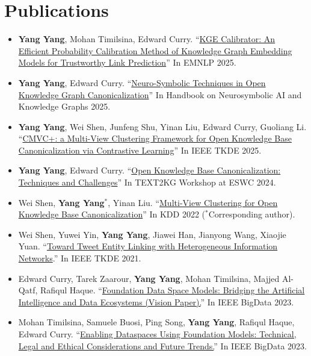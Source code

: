 \documentclass[a4paper,12pt]{article} %
\begin{document}
\section{Publications}
\begin{itemize}
\item {\textbf{Yang Yang}, Mohan Timilsina, Edward Curry. “\href{}{KGE Calibrator: An Efficient Probability Calibration Method of Knowledge Graph Embedding Models for Trustworthy Link Prediction}” In EMNLP 2025. }

\item {\textbf{Yang Yang}, Edward Curry. “\href{https://ebooks.iospress.nl/volumearticle/72299}{Neuro-Symbolic Techniques in Open Knowledge Graph Canonicalization}” In Handbook on Neurosymbolic AI and Knowledge Graphs 2025. }

\item {\textbf{Yang Yang}, Wei Shen, Junfeng Shu, Yinan Liu, Edward Curry, Guoliang Li. “\href{https://drive.google.com/file/d/19y55BQx21IJrOf-jqywshk4yBrQE0ANr/view}{CMVC+: a Multi-View Clustering Framework for Open Knowledge Base Canonicalization via Contrastive Learning}” In IEEE TKDE 2025. }

\item {\textbf{Yang Yang}, Edward Curry. “\href{https://ceur-ws.org/Vol-3747/text2kg_paper5.pdf}{Open Knowledge Base Canonicalization: Techniques and Challenges}” In TEXT2KG Workshop at ESWC 2024. }

\item {Wei Shen, \textbf{Yang Yang}$^{*}$, Yinan Liu. “\href{https://dl.acm.org/doi/abs/10.1145/3534678.3539449}{Multi-View Clustering for Open Knowledge Base Canonicalization}” In KDD 2022 ($^{*}$Corresponding author). }

\item {Wei Shen, Yuwei Yin, \textbf{Yang Yang}, Jiawei Han, Jianyong Wang, Xiaojie Yuan. “\href{https://drive.google.com/file/d/1OXgXAR6FQsnNHFkYkdKYR9XvXrhDcDja/view}{Toward Tweet Entity Linking with Heterogeneous Information Networks}.” In IEEE TKDE 2021. }

\item {Edward Curry, Tarek Zaarour, \textbf{Yang Yang}, Mohan Timilsina, Majjed Al-Qatf, Rafiqul Haque. “\href{https://drive.google.com/file/d/1tg188Hmcf2UZfPNU85NgRhaFfhiK_vg5/view}{Foundation Data Space Models: Bridging the Artificial Intelligence and Data Ecosystems (Vision Paper).}” In IEEE BigData 2023. }

\item {Mohan Timilsina, Samuele Buosi, Ping Song, \textbf{Yang Yang}, Rafiqul Haque, Edward Curry. “\href{https://drive.google.com/file/d/1pHXlfak9GEc0Z5LBGY3x7HvKhlbvSFla/view}{Enabling Dataspaces Using Foundation Models: Technical, Legal and Ethical Considerations and Future Trends.}” In IEEE BigData 2023. }
\end{itemize}
\end{document}
